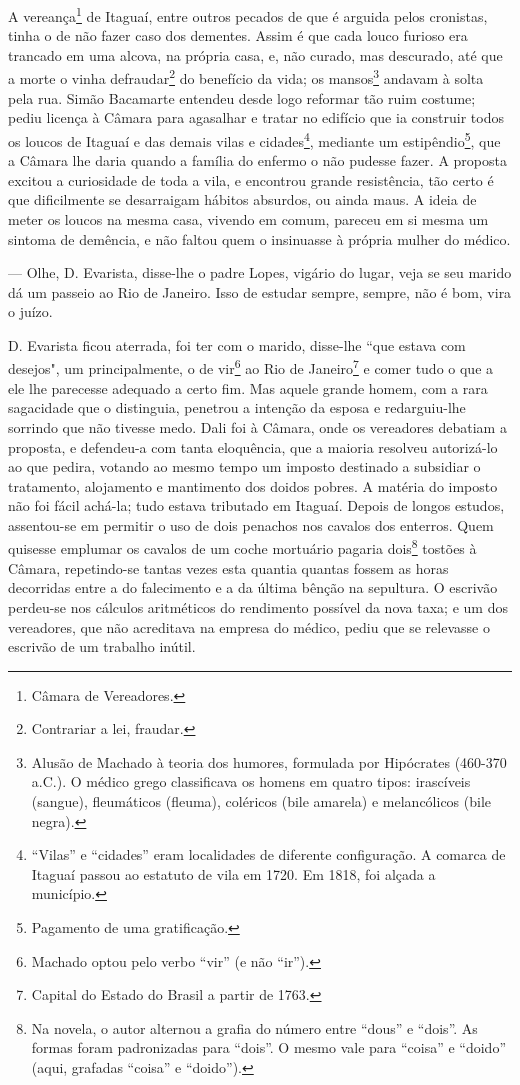 A vereança\footnote{Câmara de Vereadores.} de Itaguaí, entre outros
pecados de que é arguida pelos cronistas, tinha o de não fazer caso dos
dementes. Assim é que cada louco furioso era trancado em uma alcova, na
própria casa, e, não curado, mas descurado, até que a morte o vinha
defraudar\footnote{Contrariar a lei, fraudar.} do benefício da vida; os
mansos\footnote{Alusão de Machado à teoria dos humores, formulada por
  Hipócrates (460-370 a.C.). O médico grego classificava os homens em
  quatro tipos: irascíveis (sangue), fleumáticos (fleuma), coléricos
  (bile amarela) e melancólicos (bile negra).} andavam à solta pela rua.
Simão Bacamarte entendeu desde logo reformar tão ruim costume; pediu
licença à Câmara para agasalhar e tratar no edifício que ia construir
todos os loucos de Itaguaí e das demais vilas e cidades\footnote{``Vilas''
  e ``cidades'' eram localidades de diferente configuração. A comarca de
  Itaguaí passou ao estatuto de vila em 1720. Em 1818, foi alçada a
  município.}, mediante um estipêndio\footnote{Pagamento de uma
  gratificação.}, que a Câmara lhe daria quando a família do enfermo o
não pudesse fazer. A proposta excitou a curiosidade de toda a vila, e
encontrou grande resistência, tão certo é que dificilmente se
desarraigam hábitos absurdos, ou ainda maus. A ideia de meter os loucos
na mesma casa, vivendo em comum, pareceu em si mesma um sintoma de
demência, e não faltou quem o insinuasse à própria mulher do médico.

--- Olhe, D. Evarista, disse-lhe o padre Lopes, vigário do lugar, veja
se seu marido dá um passeio ao Rio de Janeiro. Isso de estudar sempre,
sempre, não é bom, vira o juízo.

D. Evarista ficou aterrada, foi ter com o marido, disse-lhe ``que estava
com desejos", um principalmente, o de vir\footnote{Machado optou pelo
  verbo ``vir'' (e não ``ir'').} ao Rio de Janeiro\footnote{Capital do
  Estado do Brasil a partir de 1763.} e comer tudo o que a ele lhe
parecesse adequado a certo fim. Mas aquele grande homem, com a rara
sagacidade que o distinguia, penetrou a intenção da esposa e
redarguiu-lhe sorrindo que não tivesse medo. Dali foi à Câmara, onde os
vereadores debatiam a proposta, e defendeu-a com tanta eloquência, que a
maioria resolveu autorizá-lo ao que pedira, votando ao mesmo tempo um
imposto destinado a subsidiar o tratamento, alojamento e mantimento dos
doidos pobres. A matéria do imposto não foi fácil achá-la; tudo estava
tributado em Itaguaí. Depois de longos estudos, assentou-se em permitir
o uso de dois penachos nos cavalos dos enterros. Quem quisesse emplumar
os cavalos de um coche mortuário pagaria dois\footnote{Na novela, o
  autor alternou a grafia do número entre ``dous'' e ``dois''. As formas
  foram padronizadas para ``dois''. O mesmo vale para ``coisa'' e
  ``doido'' (aqui, grafadas ``coisa'' e ``doido'').} tostões à Câmara,
repetindo-se tantas vezes esta quantia quantas fossem as horas
decorridas entre a do falecimento e a da última bênção na sepultura. O
escrivão perdeu-se nos cálculos aritméticos do rendimento possível da
nova taxa; e um dos vereadores, que não acreditava na empresa do médico,
pediu que se relevasse o escrivão de um trabalho inútil.


